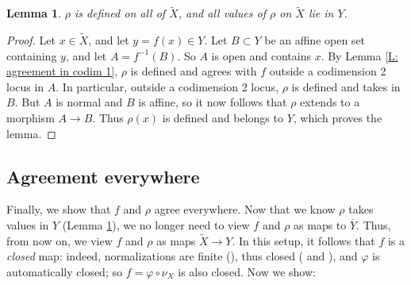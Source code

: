 \documentclass{amsart}
\newtheorem{lemma}[theorem]{Lemma}
\theoremstyle{definition}
\begin{document}
\begin{lemma}\label{L: rational map defined everywhere}
$\rho$ is defined on all of $\widetilde X$, and all values of $\rho$ on $\widetilde X$ lie in $Y$. 
\end{lemma}
\begin{proof}
    Let $x\in\widetilde X$, and let $y=f(x)\in Y$. Let $B\subset Y$ be an affine open set containing $y$, and let $A=f^{-1}(B)$. So $A$ is open and contains $x$. By Lemma \ref{L: agreement in codim 1}, $\rho$ is defined and agrees with $f$ outside a codimension 2 locus in $A$. In particular, outside a codimension 2 locus, $\rho$ is defined and takes in $B$. But $A$ is normal and $B$ is affine, so it now follows that $\rho$ extends to a morphism $A\rightarrow B$. Thus $\rho(x)$ is defined and belongs to $Y$, which proves the lemma. 
\end{proof}

\subsection{Agreement everywhere}

Finally, we show that $f$ and $\rho$ agree everywhere. Now that we know $\rho$ takes values in $Y$ (Lemma \ref{L: rational map defined everywhere}), we no longer need to view $f$ and $\rho$ as maps to $\overline Y$. Thus, from now on, we view $f$ and $\rho$ as maps $\widetilde X\rightarrow Y$. In this setup, it follows that $f$ is a \textit{closed} map: indeed, normalizations are finite (\cite[\href{https://stacks.math.columbia.edu/tag/0BXR}{Lemma 0BXR}]{stacks-project}), thus closed (\cite[\href{https://stacks.math.columbia.edu/tag/01WJ}{Lemma 01WJ}]{stacks-project} and \cite[\href{https://stacks.math.columbia.edu/tag/01WM}{Lemma 01WM}]{stacks-project}), and $\varphi$ is automatically closed; so $f=\varphi\circ\nu_X$ is also closed. Now we show:
\end{document}
